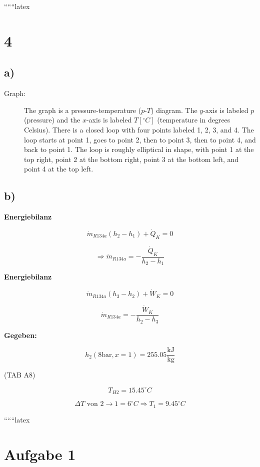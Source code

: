 
``````latex


\section*{4}

\subsection*{a)}

\begin{description}
    \item[Graph:] The graph is a pressure-temperature ($p$-$T$) diagram. The $y$-axis is labeled $p$ (pressure) and the $x$-axis is labeled $T [^\circ C]$ (temperature in degrees Celsius). There is a closed loop with four points labeled 1, 2, 3, and 4. The loop starts at point 1, goes to point 2, then to point 3, then to point 4, and back to point 1. The loop is roughly elliptical in shape, with point 1 at the top right, point 2 at the bottom right, point 3 at the bottom left, and point 4 at the top left.
\end{description}

\subsection*{b)}

\textbf{Energiebilanz}

\[
\dot{m}_{R134a} (h_2 - h_1) + \dot{Q}_K = 0
\]

\[
\Rightarrow \dot{m}_{R134a} = - \frac{\dot{Q}_K}{h_2 - h_1}
\]

\textbf{Energiebilanz}

\[
\dot{m}_{R134a} (h_3 - h_2) + \dot{W}_K = 0
\]

\[
\dot{m}_{R134a} = - \frac{\dot{W}_K}{h_2 - h_3}
\]

\textbf{Gegeben:}

\[
h_2 (8 \text{bar}, x=1) = 255.05 \frac{\text{kJ}}{\text{kg}}
\]

(TAB A8)

\[
T_{H2} = 15.45^\circ C
\]

\[
\Delta T \text{ von 2} \rightarrow 1 = 6^\circ C \Rightarrow T_1 = 9.45^\circ C
\]

``````latex

\section*{Aufgabe 1}

